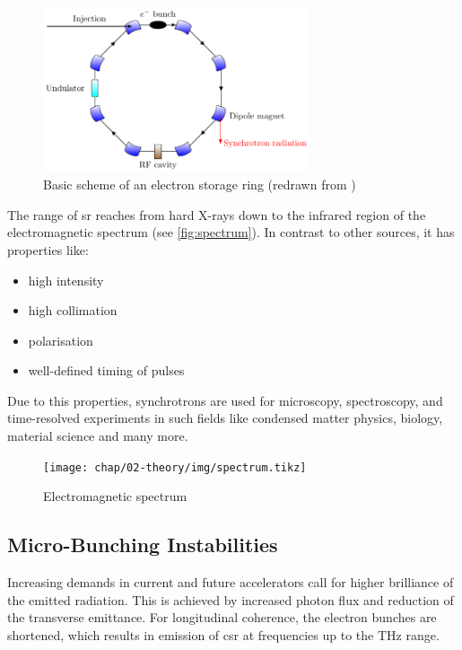 	\begin{figure}[tbh]
		\centering
		\includegraphics[width=0.7\textwidth]{chap/02-theory/img/synchrotron}
		\caption{Basic scheme of an electron storage ring (redrawn from \cite{roussel2014})}
		\label{fig:storageRing}
	\end{figure}
	
	
	The range of \gls{sr} reaches from hard X-rays down to the infrared region of the electromagnetic spectrum (see \autoref{fig:spectrum}). In contrast to other sources, it has properties like:
	\begin{itemize}[noitemsep]
		\item high intensity 
		\item high collimation
		\item polarisation
		\item well-defined timing of pulses
	\end{itemize}
	
	Due to this properties, synchrotrons are used for microscopy, spectroscopy, and time-resolved experiments in such fields like condensed matter physics, biology, material science and many more.
	\begin{figure}[H]
		\centering
		\texttt{[image: chap/02-theory/img/spectrum.tikz]}
		\caption{Electromagnetic spectrum} %
		\label{fig:spectrum}
	\end{figure}
	
	\subsection{Micro-Bunching Instabilities}
	Increasing demands in current and future accelerators call for higher brilliance of the emitted radiation.
	This is achieved by increased photon flux and reduction of the transverse emittance.
	For longitudinal coherence, the electron bunches are shortened, which results in emission of \gls{csr} at frequencies up to the THz range.
	
